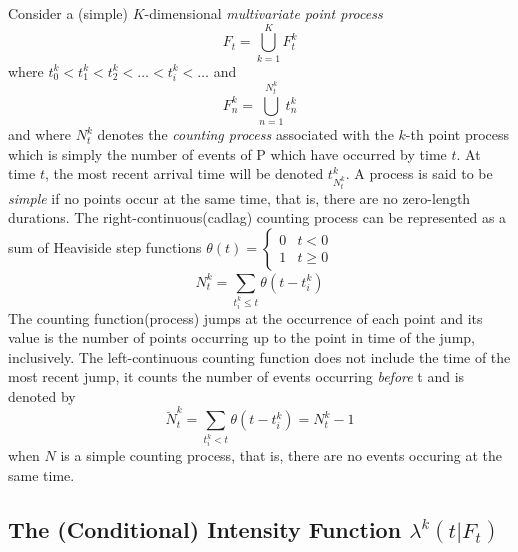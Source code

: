 \documentclass{amsart}
\newcommand{\tmem}[1]{{\em #1\/}}
\begin{document}
Consider a (simple) $K$-dimensional {\tmem{multivariate point process}}
\begin{equation}
  F_t = \bigcup_{k = 1}^K F^k_t
\end{equation}
where $t_0^k < t_1^k < t_2^k < \ldots < t_i^k < \ldots$ and
\begin{equation}
  F^k_n = \bigcup_{n = 1}^{N^k_t} t^k_n
\end{equation}
and where $N^k_t$ denotes the {\tmem{counting process}} associated with the
$k$-th point process which is simply the number of events of P which have
occurred by time $t$. At time $t$, the most recent arrival time will be
denoted $t_{N^k_t}^k$. A process is said to be {\tmem{simple}} if no points
occur at the same time, that is, there are no zero-length durations. The
right-continuous(cadlag) counting
process{\cite[4.1.1.2]{hautsch2011econometrics}} can be represented as a sum
of Heaviside step functions $\theta ( t) = \left\{ \begin{array}{ll}
  0 & t < 0\\
  1 & t \geqslant 0
\end{array} \right.$
\begin{equation}
  N^k_t = \sum_{t_i^k \leqslant t}^{} \theta ( t - t_i^k)
\end{equation}
The counting function(process) jumps at the occurrence of each point and its
value is the number of points occurring up to the point in time of the jump,
inclusively. The left-continuous counting function does not include the time
of the most recent jump, it counts the number of events occurring
{\tmem{before}} t and is denoted by
\begin{equation}
  \breve{N}^k_t = \sum_{t_i^k < t} \theta ( t - t_i^k) = N_t^k - 1
\end{equation}
when $N$ is a simple counting process, that is, there are no events occuring
at the same time.

\subsection{The (Conditional) Intensity Function $\lambda^k ( t | F^{}_t)$}
\end{document}
